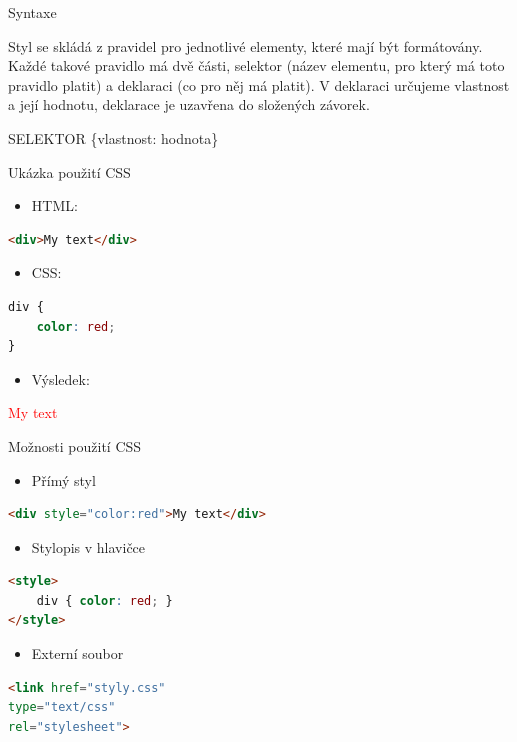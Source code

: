 \documentclass{beamer}
\begin{document}
\begin{frame}{Syntaxe}

Styl se skládá z pravidel pro jednotlivé elementy,
které mají být formátovány. Každé takové pravidlo
má dvě části, selektor (název elementu, pro který
má toto pravidlo platit) a deklaraci (co pro něj má
platit). V deklaraci určujeme vlastnost a její hodnotu,
deklarace je uzavřena do složených závorek.

SELEKTOR \{vlastnost: hodnota\}

	
\end{frame}

\begin{frame}[fragile, shrink=0]{Ukázka použití CSS}
\begin{itemize}
	\item HTML:
\end{itemize}
\begin{lstlisting}[language=HTML]
<div>My text</div>
\end{lstlisting}

\begin{itemize}
	\item CSS:
\end{itemize}
\begin{lstlisting}[language=CSS]
div {
    color: red;
}
\end{lstlisting}
\begin{itemize}
	\item Výsledek:
\end{itemize}

\textcolor{red}{My text}
 
\end{frame}

\begin{frame}[fragile, shrink=0]{Možnosti použití CSS}

\begin{itemize}
	\item Přímý styl
\end{itemize}
\begin{lstlisting}[language=HTML]
<div style="color:red">My text</div>
\end{lstlisting}

\begin{itemize}
	\item Stylopis v hlavičce
\end{itemize}
\begin{lstlisting}[language=HTML]
<style> 
	div { color: red; }
</style>
\end{lstlisting}

\begin{itemize}
	\item Externí soubor
\end{itemize}
\begin{lstlisting}[language=HTML]
<link href="styly.css" 
type="text/css" 
rel="stylesheet">
\end{lstlisting}
\end{frame}
\end{document}
